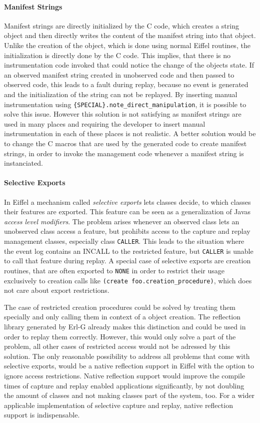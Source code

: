 \paragraph{Manifest Strings}
Manifest strings are directly initialized by the C code, which creates a string object and then directly writes the content of the manifest string into that object. Unlike the creation of the object, which is done using normal Eiffel routines, the initialization is directly done by the C code. This implies, that there is no instrumentation code invoked that could notice the change of the objects state. If an observed manifest string created in unobserved code and then passed to observed code, this leads to a fault during replay, because no event is generated and the initialization of the string can not be replayed. By inserting manual instrumentation using \texttt{\{SPECIAL\}.note\_direct\_manipulation}, it is possible to solve this issue. However this solution is not satisfying as manifest strings are used in many places and requiring the developer to insert manual instrumentation in each of these places is not realistic. A better solution would be to change the C macros that are used by the generated code to create manifest strings, in order to invoke the management code whenever a manifest string is instanciated.

\paragraph{Selective Exports}
In Eiffel a mechanism called \emph{selective exports} \cite{oosc2} lets classes decide, to which classes their features are exported. This feature can be seen as a generalization of Javas \emph{access level modifiers}. The problem arises whenever an observed class lets an unobserved class access a feature, but prohibits access to the capture and replay management classes, especially class \texttt{CALLER}. This leads to the situation where the event log contains an INCALL to the restricted feature, but \texttt{CALLER} is unable to call that feature during replay. A special case of selective exports are creation routines, that are often exported to \texttt{NONE} in order to restrict their usage exclusively to creation calls like \texttt{(create foo.creation\_procedure)}, which does not care about export restrictions.

The case of restricted creation procedures could be solved by treating them specially and only calling them in context of a object creation. The reflection library generated by Erl-G already makes this distinction and could be used in order to replay them correctly. However, this would only solve a part of the problem, all other cases of restricted access would not be adressed by this solution. The only reasonable possibility to address all problems that come with selective exports, would be a native reflection support in Eiffel with the option to ignore access restrictions. Native reflection support would improve the compile times of capture and replay enabled applications significantly, by not doubling the amount of classes and not making classes part of the system, too. For a wider applicable implementation of selective capture and replay, native reflection support is indispensable.

